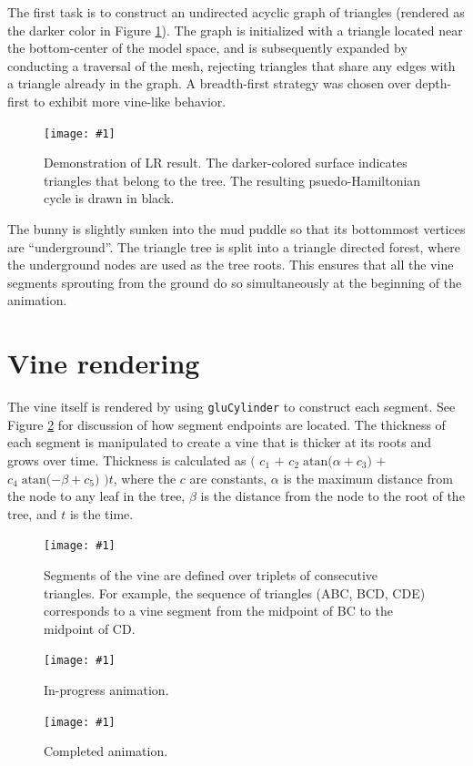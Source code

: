 \documentclass{article}
\newcommand\screenshot[1]{\texttt{[image: \#1]}}
\begin{document}
The first task is to construct an undirected
acyclic graph of triangles (rendered as the
darker color in Figure \ref{fig:lr}).
The graph is initialized with a triangle
located near the bottom-center of the model
space, and is subsequently expanded by conducting
a traversal of the mesh, rejecting triangles
that share any edges with a triangle already
in the graph. A breadth-first strategy was chosen
over depth-first to exhibit more vine-like behavior.

\begin{figure}
\centering
\screenshot{cycle}
\caption{Demonstration of LR result. The darker-colored
surface indicates triangles that belong to the tree.
The resulting psuedo-Hamiltonian cycle is drawn in black.}
\label{fig:lr}
\end{figure}

The bunny is slightly sunken into the mud puddle
so that its bottommost vertices are ``underground''.
The triangle tree is split into a triangle directed forest,
where the underground nodes are used as the tree roots.
This ensures that all the vine segments sprouting from the
ground do so simultaneously at the beginning of the animation.

\section{Vine rendering}

The vine itself is rendered by using {\tt gluCylinder}
to construct each segment.
See Figure \ref{fig:segment} for discussion of how
segment endpoints are located.
The thickness of each segment is manipulated to create
a vine that is thicker at its roots and grows over time.
Thickness is calculated as $($ $c_1$ $+$
$c_2\; \text{atan($\alpha+c_3$)}$ $+$
$c_4\; \text{atan($-\beta+c_5$)}$ $) t$,
where the $c$ are constants,
$\alpha$ is the maximum distance from the node to any
leaf in the tree, $\beta$ is the distance from the node
to the root of the tree, and $t$ is the time.

\begin{figure}
\centering
\screenshot{segment}
\caption{Segments of the vine are defined over
triplets of consecutive triangles.
For example, the sequence of triangles
(ABC, BCD, CDE)
corresponds to a vine segment from the midpoint
of BC to the midpoint of CD.}
\label{fig:segment}
\end{figure}

\begin{figure}
\centering
\screenshot{partial}
\caption{In-progress animation.}
\end{figure}

\begin{figure}
\centering
\screenshot{full}
\caption{Completed animation.}
\end{figure}

{}

\end{document}
